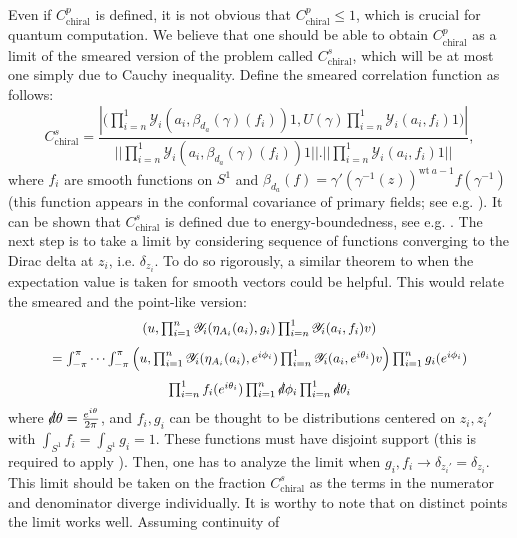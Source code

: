 \documentclass[twoside,11pt,titlepage]{amsart}
\renewcommand{\=}[1]{\stackrel{#1}{=}} %
\theoremstyle{definition}
\theoremstyle{remark}
\begin{document}
Even if $C_{\text{chiral}}^p$ is defined, it is not obvious that $C_{\text{chiral}}^p \le 1$, which is crucial for quantum computation. We believe that one should be able to obtain $C_{\text{chiral}}^p$ as a limit of the smeared version of the problem called $C_{\text{chiral}}^s$, which will be at most one simply due to Cauchy inequality. Define the smeared correlation function as follows:
$$C_{\text{chiral}}^s=\frac{|\Big(\prod_{i=n}^1\mathscr{Y}_i(a_i,\beta_{d_a}(\gamma)(f_i))1,U(\gamma)\prod_{i=n}^1\mathscr{Y}_i(a_i,f_i)1\Big)|}{||\prod_{i=n}^1\mathscr{Y}_i(a_i,\beta_{d_a}(\gamma)(f_i))1||. ||\prod_{i=n}^1\mathscr{Y}_i(a_i,f_i)1||},$$
where $f_i$ are smooth functions on $S^1$ and $\beta_{d_a}(f)=\gamma'(\gamma^{-1}(z))^{\text{wt}\  a-1}f(\gamma^{-1})$ (this function appears in the conformal covariance of primary fields; see e.g. \cite[Proposition 6.4]{carpi2015vertex}). It can be shown that $C_{\text{chiral}}^s$ is defined due to energy-boundedness, see e.g. \cite[Proposition 3.9]{gui2017unitarity}. The next step is to take a limit by considering sequence of functions converging to the Dirac delta at $z_i$, i.e. $\delta_{z_i}$. To do so rigorously, a similar theorem to \cite[Proposition 3.12]{gui2017unitarity} when the expectation value is taken for smooth vectors could be helpful. This would relate the smeared and the point-like version:
\begin{gather*}
\scalebox{0.95}{$(u,\prod_{i=1}^n\mathscr{Y}_i(\eta_{A_i}(a_i),g_i)\prod_{i=n}^1\mathscr{Y}_i(a_i,f_i)v)$}
\end{gather*}
\begin{gather*}
\scalebox{0.95}{$=\int_{-\pi}^\pi \cdots \int_{-\pi}^\pi \Big(u,\prod_{i=1}^n\mathscr{Y}_i(\eta_{A_i}(a_i),e^{i\phi_i})\prod_{i=n}^1\mathscr{Y}_i(a_i,e^{i\theta_i})v\Big)\prod_{i=1}^n g_i(e^{i\phi_i}) $}
\end{gather*}
\begin{gather*}
\scalebox{0.95}{$\prod_{i=n}^1f_i(e^{i\theta_i})\prod_{i=1}^n \slashed{d}\phi_i \prod_{i=n}^1 \slashed{d}\theta_i$}
\end{gather*}
where $\slashed{d} \theta=\frac{e^{i\theta}}{2\pi}$, and $f_i,g_i$ can be thought to be distributions centered on $z_i,z_i'$ with $\int_{S^1} f_i=\int_{S^1} g_i=1$. These functions must have disjoint support (this is required to apply \cite[Proposition 3.12]{gui2017unitarity}). Then, one has to analyze the limit when $g_i, f_i \to \delta_{z_i'}=\delta_{z_i}$. This limit should be taken on the fraction $C_{\text{chiral}}^s$ as the terms in the numerator and denominator diverge individually. It is worthy to note that on distinct points the limit works well. Assuming continuity of
\end{document}

